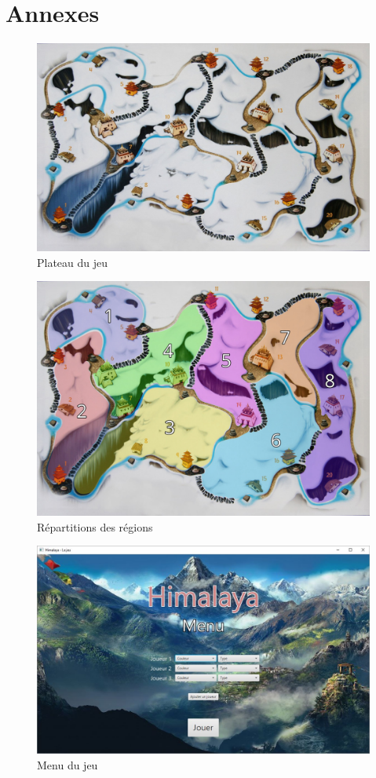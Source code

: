 \section{Annexes}

\begin{figure}[h]
	\centering
	\includegraphics[width=0.7\linewidth]{images/plateau}
	\caption{Plateau du jeu}
	\label{fig:plateau}
\end{figure}

\begin{figure}[h]
	\centering
	\includegraphics[width=0.7\linewidth]{images/board_regions}
	\caption{Répartitions des régions}
	\label{fig:board_region}
\end{figure}

\begin{figure}[h]
	\centering
	\includegraphics[width=0.9\linewidth]{images/menu}
	\caption{Menu du jeu}
	\label{fig:menu}
\end{figure}

